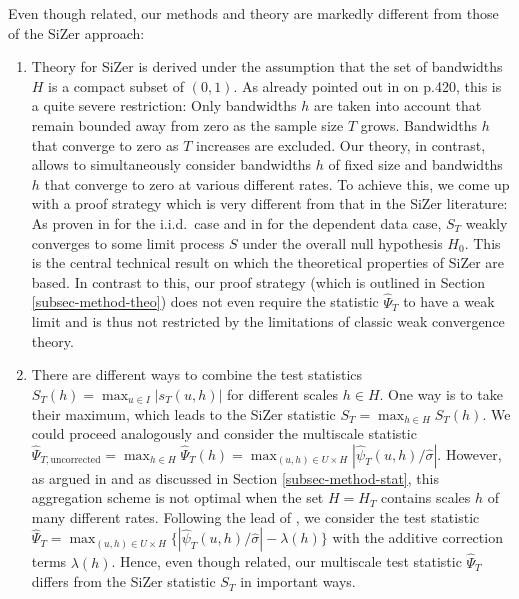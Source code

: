 Even though related, our methods and theory are markedly different from those of the SiZer approach:
\begin{enumerate}[label=(\roman*), leftmargin=0.75cm]

\item Theory for SiZer is derived under the assumption that the set of bandwidths $H$ is a compact subset of $(0,1)$. As already pointed out in \cite{ChaudhuriMarron2000} on p.420, this is a quite severe restriction: Only bandwidths $h$ are taken into account that remain bounded away from zero as the sample size $T$ grows. Bandwidths $h$ that converge to zero as $T$ increases are excluded. Our theory, in contrast, allows to simultaneously consider bandwidths $h$ of fixed size and bandwidths $h$ that converge to zero at various different rates. To achieve this, we come up with a proof strategy which is very different from that in the SiZer literature:  As proven in \cite{ChaudhuriMarron2000} for the i.i.d.\ case and in \cite{ParkHannigKang2009} for the dependent data case, $S_T$ weakly converges to some limit process $S$ under the overall null hypothesis $H_0$. This is the central technical result on which the theoretical properties of SiZer are based. In contrast to this, our proof strategy (which is outlined in Section \ref{subsec-method-theo}) does not even require the statistic $\widehat{\Psi}_T$ to have a weak limit and is thus not restricted by the limitations of classic weak convergence theory. 

\item There are different ways to combine the test statistics $S_T(h) = \max_{u \in I} |s_T(u,h)|$ for different scales $h \in H$. One way is to take their maximum, which leads to the SiZer statistic $S_T = \max_{h \in H} S_T(h)$. We could proceed analogously and consider the multiscale statistic $\widehat{\Psi}_{T,\text{uncorrected}} = \max_{h \in H} \widehat{\Psi}_T(h) = \max_{(u,h) \in U \times H} |\widehat{\psi}_T(u,h)/\widehat{\sigma}|$. However, as argued in \cite{DuembgenSpokoiny2001} and as discussed in Section \ref{subsec-method-stat}, this aggregation scheme is not optimal when the set $H = H_T$ contains scales $h$ of many different rates. Following the lead of \cite{DuembgenSpokoiny2001}, we consider the test statistic $\widehat{\Psi}_T = \max_{(u,h) \in U \times H} \{ |\widehat{\psi}_T(u,h)/\widehat{\sigma}| - \lambda(h) \}$ with the additive correction terms $\lambda(h)$. Hence, even though related, our multiscale test statistic $\widehat{\Psi}_T$ differs from the SiZer statistic $S_T$ in important ways. 


\end{enumerate}
